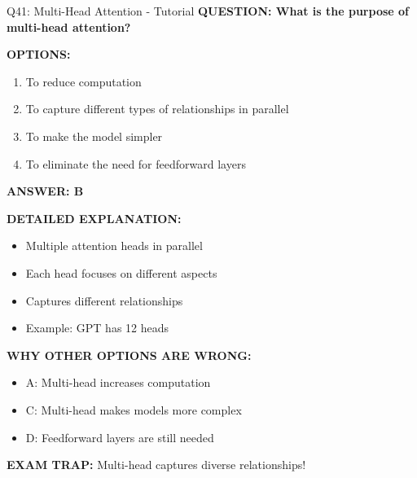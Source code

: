 \documentclass[8pt]{beamer}
\begin{document}
	\begin{frame}{Q41: Multi-Head Attention - Tutorial}
		\fontsize{6.5}{7.5}\selectfont
		\textbf{QUESTION: What is the purpose of multi-head attention?}
		
		\vspace{0.1cm}
		\textbf{OPTIONS:}
		\begin{enumerate}
			\item To reduce computation
			\item To capture different types of relationships in parallel
			\item To make the model simpler
			\item To eliminate the need for feedforward layers
		\end{enumerate}
		
		\vspace{0.1cm}
		\textcolor{myblue}{\textbf{ANSWER: B}}
		
		\vspace{0.1cm}
		\textbf{DETAILED EXPLANATION:}
		\begin{itemize}
			\item Multiple attention heads in parallel
			\item Each head focuses on different aspects
			\item Captures different relationships
			\item Example: GPT has 12 heads
		\end{itemize}
		
		\vspace{0.1cm}
		\textcolor{myred}{\textbf{WHY OTHER OPTIONS ARE WRONG:}}
		\begin{itemize}
			\item \textcolor{myred}{A:} Multi-head increases computation
			\item \textcolor{myred}{C:} Multi-head makes models more complex
			\item \textcolor{myred}{D:} Feedforward layers are still needed
		\end{itemize}
		
		\textcolor{myred}{\textbf{EXAM TRAP:}} Multi-head captures \textcolor{myblue}{diverse relationships}!
	\end{frame}
	
\end{document}
